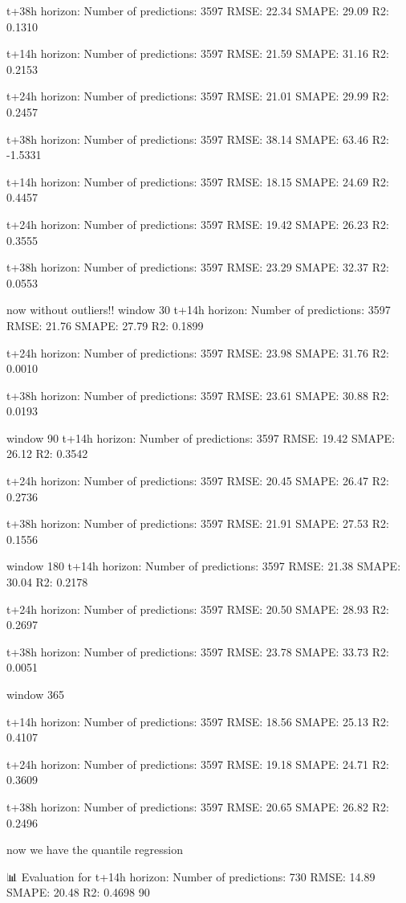 t+38h horizon:
Number of predictions: 3597
RMSE: 22.34
SMAPE: 29.09%
R2: 0.1310

t+14h horizon:
Number of predictions: 3597
RMSE: 21.59
SMAPE: 31.16%
R2: 0.2153

t+24h horizon:
Number of predictions: 3597
RMSE: 21.01
SMAPE: 29.99%
R2: 0.2457

t+38h horizon:
Number of predictions: 3597
RMSE: 38.14
SMAPE: 63.46%
R2: -1.5331


t+14h horizon:
Number of predictions: 3597
RMSE: 18.15
SMAPE: 24.69%
R2: 0.4457

t+24h horizon:
Number of predictions: 3597
RMSE: 19.42
SMAPE: 26.23%
R2: 0.3555

t+38h horizon:
Number of predictions: 3597
RMSE: 23.29
SMAPE: 32.37%
R2: 0.0553

now without outliers!!
window 30
t+14h horizon:
Number of predictions: 3597
RMSE: 21.76
SMAPE: 27.79%
R2: 0.1899

t+24h horizon:
Number of predictions: 3597
RMSE: 23.98
SMAPE: 31.76%
R2: 0.0010

t+38h horizon:
Number of predictions: 3597
RMSE: 23.61
SMAPE: 30.88%
R2: 0.0193

window 90
t+14h horizon:
Number of predictions: 3597
RMSE: 19.42
SMAPE: 26.12%
R2: 0.3542

t+24h horizon:
Number of predictions: 3597
RMSE: 20.45
SMAPE: 26.47%
R2: 0.2736

t+38h horizon:
Number of predictions: 3597
RMSE: 21.91
SMAPE: 27.53%
R2: 0.1556

window 180
t+14h horizon:
Number of predictions: 3597
RMSE: 21.38
SMAPE: 30.04%
R2: 0.2178

t+24h horizon:
Number of predictions: 3597
RMSE: 20.50
SMAPE: 28.93%
R2: 0.2697

t+38h horizon:
Number of predictions: 3597
RMSE: 23.78
SMAPE: 33.73%
R2: 0.0051


window 365

t+14h horizon:
Number of predictions: 3597
RMSE: 18.56
SMAPE: 25.13%
R2: 0.4107

t+24h horizon:
Number of predictions: 3597
RMSE: 19.18
SMAPE: 24.71%
R2: 0.3609

t+38h horizon:
Number of predictions: 3597
RMSE: 20.65
SMAPE: 26.82%
R2: 0.2496


now we have the quantile regression

📊 Evaluation for t+14h horizon:
Number of predictions: 730
RMSE: 14.89
SMAPE: 20.48%
R2: 0.4698
90%


